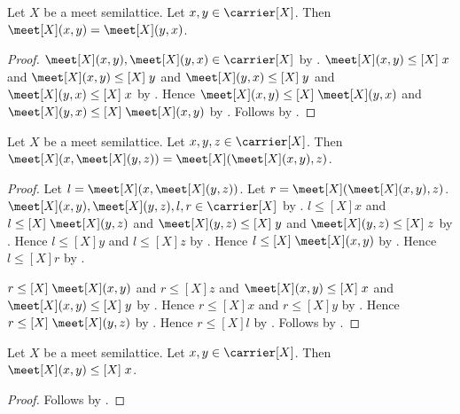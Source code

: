 \begin{theorem}\label{meet_commutative}
    Let $X$ be a meet semilattice.
    Let $x,y\in\carrier[X]$.
    Then $\meet[X](x,y)=\meet[X](y,x)$.
\end{theorem}
\begin{proof}
    $\meet[X](x,y),\meet[X](y,x)\in\carrier[X]$
        by .
    $\meet[X](x,y)\mathrel{\leq[X]}x$ and
        $\meet[X](x,y)\mathrel{\leq[X]}y$ and
        $\meet[X](y,x)\mathrel{\leq[X]}y$ and
        $\meet[X](y,x)\mathrel{\leq[X]}x$
        by .
    Hence $\meet[X](x,y)\mathrel{\leq[X]}\meet[X](y,x)$ and
        $\meet[X](y,x)\mathrel{\leq[X]}\meet[X](x,y)$
        by .
    Follows by
        .
\end{proof}

\begin{theorem}\label{meet_associative}
    Let $X$ be a meet semilattice.
    Let $x,y,z\in\carrier[X]$.
    Then
        $\meet[X](x,\meet[X](y,z))
            =\meet[X](\meet[X](x,y),z)$.
\end{theorem}
\begin{proof}
    Let $l=\meet[X](x,\meet[X](y,z))$.
    Let $r=\meet[X](\meet[X](x,y),z)$.
    $\meet[X](x,y),\meet[X](y,z),l,r\in\carrier[X]$
        by .
    $l\mathrel{\leq[X]}x$ and
        $l\mathrel{\leq[X]}\meet[X](y,z)$ and
        $\meet[X](y,z)\mathrel{\leq[X]}y$ and
        $\meet[X](y,z)\mathrel{\leq[X]}z$
        by .
    Hence $l\mathrel{\leq[X]}y$ and $l\mathrel{\leq[X]}z$
        by .
    Hence $l\mathrel{\leq[X]}\meet[X](x,y)$
        by .
    Hence $l\mathrel{\leq[X]}r$ by .

    $r\mathrel{\leq[X]}\meet[X](x,y)$ and
        $r\mathrel{\leq[X]}z$ and
        $\meet[X](x,y)\mathrel{\leq[X]}x$ and
        $\meet[X](x,y)\mathrel{\leq[X]}y$
        by .
    Hence $r\mathrel{\leq[X]}x$ and $r\mathrel{\leq[X]}y$
        by .
    Hence $r\mathrel{\leq[X]}\meet[X](y,z)$
        by .
    Hence $r\mathrel{\leq[X]}l$ by .
    Follows by
        .
\end{proof}

\begin{proposition}\label{meet_lower_left}
    Let $X$ be a meet semilattice.
    Let $x,y\in\carrier[X]$.
    Then $\meet[X](x,y)\mathrel{\leq[X]}x$.
\end{proposition}
\begin{proof}
    Follows by .
\end{proof}

